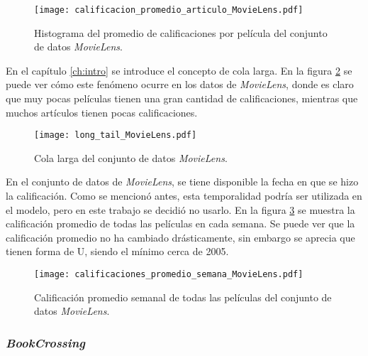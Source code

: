 \begin{figure}[H]
	\centering
 	\texttt{[image: calificacion\_promedio\_articulo\_MovieLens.pdf]}
 	\caption{Histograma del promedio de calificaciones por película del conjunto de datos \textit{MovieLens}.}
 	\label{fig:ML_hist_prom_cals}
\end{figure}

En el capítulo \ref{ch:intro} se introduce el concepto de cola larga. En la figura \ref{fig:ML_long_tail} se puede ver cómo este fenómeno ocurre en los datos de \textit{MovieLens}, donde es claro que muy pocas películas tienen una gran cantidad de calificaciones, mientras que muchos artículos tienen pocas calificaciones.

\begin{figure}[H]
	\centering
 	\texttt{[image: long\_tail\_MovieLens.pdf]}
 	\caption{Cola larga del conjunto de datos \textit{MovieLens}.}
 	\label{fig:ML_long_tail}
\end{figure}

En el conjunto de datos de \textit{MovieLens}, se tiene disponible la fecha en que se hizo la calificación. Como se mencionó antes, esta temporalidad podría ser utilizada en el modelo, pero en este trabajo se decidió no usarlo. En la figura \ref{fig:ML_calis_semana} se muestra la calificación promedio de todas las películas en cada semana. Se puede ver que la calificación promedio no ha cambiado drásticamente, sin embargo se aprecia que tienen forma de U, siendo el mínimo cerca de 2005.

\begin{figure}[H]
	\centering
 	\texttt{[image: calificaciones\_promedio\_semana\_MovieLens.pdf]}
 	\caption{Calificación promedio semanal de todas las películas del conjunto de datos \textit{MovieLens}.}
 	\label{fig:ML_calis_semana}
\end{figure}


\subsubsection{\textit{BookCrossing}}

